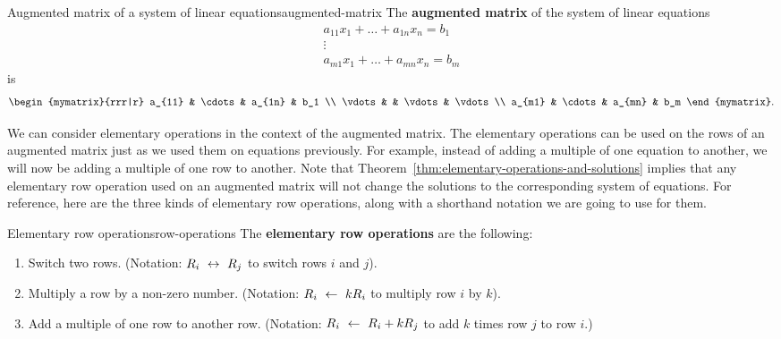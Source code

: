 \begin{definition}{Augmented matrix of a system of linear equations}{augmented-matrix}
  The \textbf{augmented matrix}%
   of the system of linear equations
  \begin{equation*}
    \begin{array}{c}
      a_{11}x_1 + \ldots + a_{1n}x_n = b_1 \\
      \vdots \\
      a_{m1}x_1 + \ldots + a_{mn}x_n = b_m
    \end{array}
  \end{equation*}
  is
  \begin{equation*}
    \begin{mymatrix}{rrr|r}
      a_{11} & \cdots & a_{1n} &  b_1 \\
      \vdots &  & \vdots &  \vdots \\
      a_{m1} & \cdots & a_{mn} &  b_m
    \end{mymatrix}.
  \end{equation*}
\end{definition}

We can consider elementary operations in the context of the augmented
matrix. The elementary operations can be used on the rows of an
augmented matrix just as we used them on equations previously. For
example, instead of adding a multiple of one equation to another, we
will now be adding a multiple of one row to another. Note that
Theorem~\ref{thm:elementary-operations-and-solutions} implies that any
elementary row operation used on an augmented matrix will not change
the solutions to the corresponding system of equations. For reference,
here are the three kinds of elementary row operations, along with a
shorthand notation we are going to use for them.

\begin{definition}{Elementary row operations}{row-operations}
  The \textbf{elementary row operations}%
   are the
  following:
  \begin{enumerate}
  \item Switch two rows. (Notation: $R_i~\leftrightarrow~ R_j$ to switch
    rows $i$ and $j$).
  \item Multiply a row by a non-zero number.  (Notation: $R_i~\leftarrow~
    kR_i$ to multiply row $i$ by $k$).
  \item Add a multiple of one row to another row. (Notation:
    $R_i~\leftarrow~ R_i+kR_j$ to add $k$ times row $j$ to row $i$.)
  \end{enumerate}
\end{definition}

